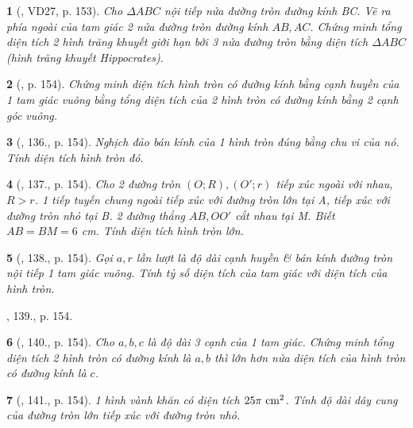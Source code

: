 \documentclass{article}
\newtheorem{baitoan}{}
\begin{document}

\begin{baitoan}[\cite{Tuyen_Toan_9_old}, VD27, p. 153]
	Cho $\Delta ABC$ nội tiếp nửa đường tròn đường kính BC. Vẽ ra phía ngoài của tam giác 2 nửa đường tròn đường kính $AB,AC$. Chứng minh tổng diện tích 2 hình trăng khuyết giới hạn bởi 3 nửa đường tròn bằng diện tích $\Delta ABC$ {\rm(hình trăng khuyết Hippocrates)}.
\end{baitoan}

\begin{baitoan}[\cite{Tuyen_Toan_9_old}, p. 154]
	Chứng minh diện tích hình tròn có đường kính bằng cạnh huyền của 1 tam giác vuông bằng tổng diện tích của 2 hình tròn có đường kính bằng 2 cạnh góc vuông.
\end{baitoan}

\begin{baitoan}[\cite{Tuyen_Toan_9_old}, 136., p. 154]
	Nghịch đảo bán kính của 1 hình tròn đúng bằng chu vi của nó. Tính diện tích hình tròn đó.
\end{baitoan}

\begin{baitoan}[\cite{Tuyen_Toan_9_old}, 137., p. 154]
	Cho 2 đường tròn $(O;R),(O';r)$ tiếp xúc ngoài với nhau, $R > r$. 1 tiếp tuyến chung ngoài tiếp xúc với đường tròn lớn tại A, tiếp xúc với đường tròn nhỏ tại B. 2 đường thẳng $AB,OO'$ cắt nhau tại M. Biết $AB = BM = 6$ {\rm cm}. Tính diện tích hình tròn lớn.
\end{baitoan}

\begin{baitoan}[\cite{Tuyen_Toan_9_old}, 138., p. 154]
	Gọi $a,r$ lần lượt là độ dài cạnh huyền \& bán kính đường tròn nội tiếp 1 tam giác vuông. Tính tỷ số diện tích của tam giác với diện tích của hình tròn.
\end{baitoan}
\noindent\cite{Tuyen_Toan_9_old}, 139., p. 154.

\begin{baitoan}[\cite{Tuyen_Toan_9_old}, 140., p. 154]
	Cho $a,b,c$ là độ dài 3 cạnh của 1 tam giác. Chứng minh tổng diện tích 2 hình tròn có đường kính là $a,b$ thì lớn hơn nửa diện tích của hình tròn có đường kính là $c$.
\end{baitoan}

\begin{baitoan}[\cite{Tuyen_Toan_9_old}, 141., p. 154]
	1 hình vành khăn có diện tích $25\pi\ {\rm cm}^2$. Tính độ dài dây cung của đường tròn lớn tiếp xúc với đường tròn nhỏ.
\end{baitoan}
\end{document}
